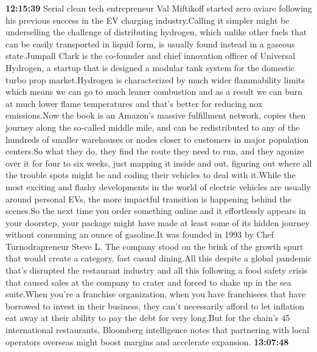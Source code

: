 \documentclass{article}%
\begin{document}
\textbf{12:15:39}%
\newline%
Serial clean tech entrepreneur Val Miftikoff started zero aviare following his previous success in the EV charging industry.Calling it simpler might be underselling the challenge of distributing hydrogen, which unlike other fuels that can be easily transported in liquid form, is usually found instead in a gaseous state.Jumpall Clark is the co{-}founder and chief innovation officer of Universal Hydrogen, a startup that is designed a modular tank system for the domestic turbo prop market.Hydrogen is characterized by much wider flammability limits which means we can go to much leaner combustion and as a result we can burn at much lower flame temperatures and that's better for reducing nox emissions.Now the book is an Amazon's massive fulfillment network, copies then journey along the so{-}called middle mile, and can be redistributed to any of the hundreds of smaller warehouses or nodes closer to customers in major population centers.So what they do, they find the route they need to run, and they agonize over it for four to six weeks, just mapping it inside and out, figuring out where all the trouble spots might be and coding their vehicles to deal with it.While the most exciting and flashy developments in the world of electric vehicles are usually around personal EVs, the more impactful transition is happening behind the scenes.So the next time you order something online and it effortlessly appears in your doorstep, your package might have made at least some of its hidden journey without consuming an ounce of gasoline.It was founded in 1993 by Chef Turnodrapreneur Steve L. The company stood on the brink of the growth spurt that would create a category, fast casual dining.All this despite a global pandemic that's disrupted the restaurant industry and all this following a food safety crisis that caused sales at the company to crater and forced to shake up in the sea suite.When you're a franchise organization, when you have franchisees that have borrowed to invest in their business, they can't necessarily afford to let inflation eat away at their ability to pay the debt for very long.But for the chain's 45 international restaurants, Bloomberg intelligence notes that partnering with local operators overseas might boost margins and accelerate expansion.%
\textbf{13:07:48}%
\newline%
\end{document}
